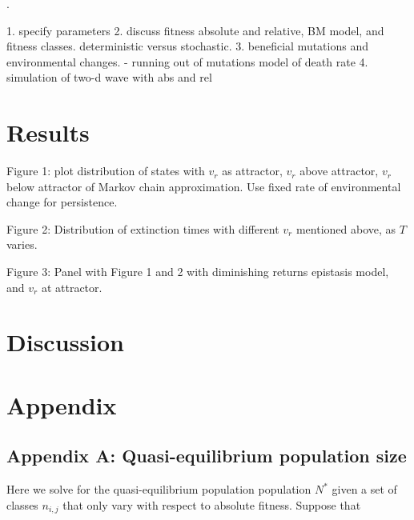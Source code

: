 \documentclass[9pt,twocolumn,twoside]{article}
\begin{document}
\citet{bertram2019density}.

1. specify parameters
2. discuss fitness absolute and relative, BM model, and fitness classes. deterministic versus stochastic.
3. beneficial mutations and environmental changes. 
- running out of mutations model of death rate
4. simulation of two-d wave with abs and rel

\section{Results}

Figure 1: plot distribution of states with $v_r$ as attractor, $v_r$ above attractor, $v_r$ below attractor of Markov chain approximation. Use fixed rate of environmental change for persistence.

Figure 2: Distribution of extinction times with different $v_r$ mentioned above, as $T$ varies.

Figure 3: Panel with Figure 1 and 2 with diminishing returns epistasis model, and $v_r$ at attractor.
\section{Discussion}


\footnotesize



\newpage
\onecolumn
\appendix
\section*{Appendix} \label{sec:appendix}
\subsection*{Appendix A: Quasi-equilibrium population size}
Here we solve for the quasi-equilibrium population population $N^*$ given a set of classes $n_{i,j}$ that only vary with respect to absolute fitness. Suppose that 
\end{document}
